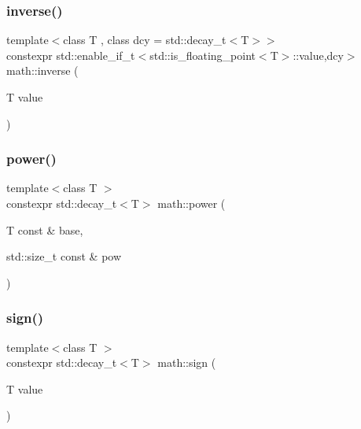 \subsubsection{\texorpdfstring{inverse()}{inverse()}}
{\footnotesize\ttfamily template$<$class T , class dcy  = std\+::decay\+\_\+t$<$\+T$>$$>$ \\
constexpr std\+::enable\+\_\+if\+\_\+t$<$std\+::is\+\_\+floating\+\_\+point$<$T$>$\+::value,dcy$>$ math\+::inverse (\begin{DoxyParamCaption}\item[{T}]{value }\end{DoxyParamCaption})\hspace{0.3cm}{\ttfamily [inline]}}

\mbox{\label{namespacemath_a096802f59879957bb79b461ee9a0ddf9}} 
\subsubsection{\texorpdfstring{power()}{power()}}
{\footnotesize\ttfamily template$<$class T $>$ \\
constexpr std\+::decay\+\_\+t$<$T$>$ math\+::power (\begin{DoxyParamCaption}\item[{T const \&}]{base,  }\item[{std\+::size\+\_\+t const \&}]{pow }\end{DoxyParamCaption})\hspace{0.3cm}{\ttfamily [inline]}}

\mbox{\label{namespacemath_a9fed6bdc392a6c857d3d1a93f735e243}} 
\subsubsection{\texorpdfstring{sign()}{sign()}}
{\footnotesize\ttfamily template$<$class T $>$ \\
constexpr std\+::decay\+\_\+t$<$T$>$ math\+::sign (\begin{DoxyParamCaption}\item[{T}]{value }\end{DoxyParamCaption})\hspace{0.3cm}{\ttfamily [inline]}}

\mbox{\label{namespacemath_a82b6cd9ca916160f03a5d1450eb7a009}} 

